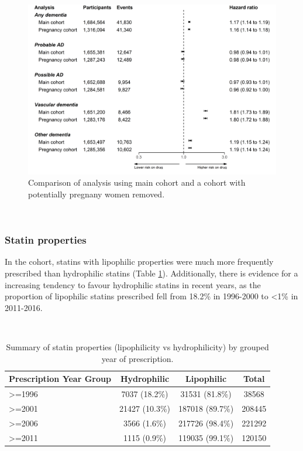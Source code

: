 \documentclass[a4paper, twoside]{templates/ociamthesis}
\begin{document}
\begin{figure}[H]
\includegraphics[width=1\linewidth]{figures/cprd-analysis/forester_pregnancy} \caption[Comparison of pregnancy analysis]{Comparison of analysis using main cohort and a cohort with potentially pregnany women removed.}\label{fig:pregnancyFig}
\end{figure}

~

\hypertarget{statin-properties-1}{%
\subsubsection{Statin properties}\label{statin-properties-1}}

In the cohort, statins with lipophilic properties were much more frequently prescribed than hydrophilic statins (Table \ref{tab:statinTypeTable-table}). Additionally, there is evidence for a increasing tendency to favour hydrophilic statins in recent years, as the proportion of lipophilic statins prescribed fell from 18.2\% in 1996-2000 to \textless1\% in 2011-2016.

~





\begin{table}[H]

\caption[Summary of statin properties (lipophilicity vs hydrophilicity).]{\label{tab:statinTypeTable-table}Summary of statin properties (lipophilicity vs hydrophilicity) by grouped year of prescription.}
\centering
\fontsize{7}{9}\selectfont
\begin{tabular}[t]{lccc}
\toprule
\textbf{\textbf{Prescription Year Group}} & \textbf{\textbf{Hydrophilic}} & \textbf{\textbf{Lipophilic}} & \textbf{\textbf{Total}}\\
\midrule
>=1996 & 7037 (18.2\%) & 31531 (81.8\%) & 38568\\
\midrule
>=2001 & 21427 (10.3\%) & 187018 (89.7\%) & 208445\\
\midrule
>=2006 & 3566 (1.6\%) & 217726 (98.4\%) & 221292\\
\midrule
>=2011 & 1115 (0.9\%) & 119035 (99.1\%) & 120150\\
\bottomrule
\end{tabular}
\end{table}
\end{document}

